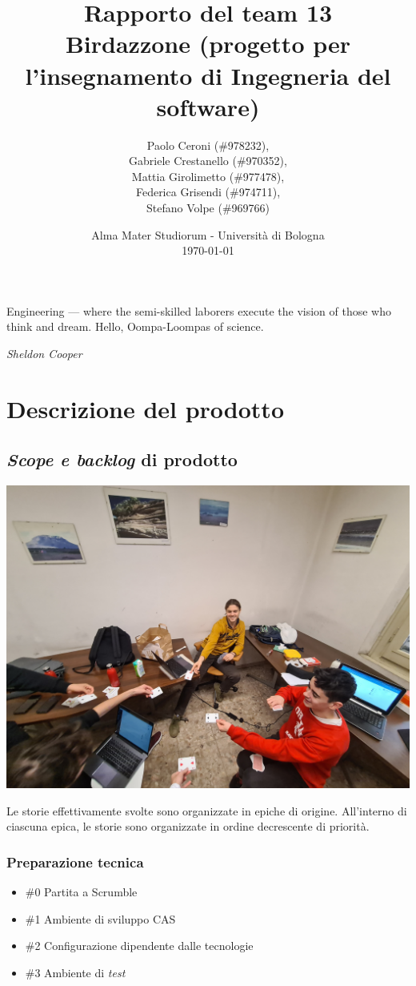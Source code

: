 \documentclass{article}
\title{
	\textbf{
		Rapporto del team 13 \\
	}
	\textbf{\large
		Birdazzone \break
		(progetto per l'insegnamento \break
		di Ingegneria del software)
	}
}
\author{
	Paolo Ceroni (\#978232), \\
	Gabriele Crestanello (\#970352), \\
	Mattia Girolimetto (\#977478), \\
	Federica Grisendi (\#974711), \\
	Stefano Volpe (\#969766)
}
\date{
	Alma Mater Studiorum - Universit\`a di Bologna \\
	\today
}
\begin{document}
\maketitle

\epigraph{
	Engineering --- where the semi-skilled laborers execute the vision of those
	who think and dream. Hello, Oompa-Loompas of science.
}{\textit{Sheldon Cooper}}

\thispagestyle{empty}
\pagebreak

\tableofcontents

\pagebreak

\section{Descrizione del prodotto}

\subsection{\emph{Scope e backlog} di prodotto}

\includegraphics[width=\textwidth]{planning-poker}

Le storie effettivamente svolte sono organizzate in epiche di origine.
All'interno di ciascuna epica, le storie sono organizzate in ordine decrescente
di priorità.

\subsubsection{Preparazione tecnica}

\begin{itemize}
	\item \#0 Partita a Scrumble
	\item \#1 Ambiente di sviluppo CAS
	\item \#2 Configurazione dipendente dalle tecnologie
	\item \#3 Ambiente di \emph{test}
\end{itemize}
\end{document}
